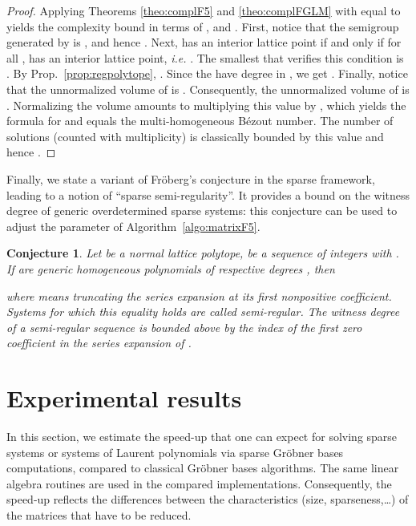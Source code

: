 \documentclass[12pt]{article}
\numberwithin{equation}{section}
\numberwithin{theorem}{section}
\newtheorem{conjecture}[theorem]{Conjecture}
\begin{document}
\begin{proof}
Applying Theorems \ref{theo:complF5} and
\ref{theo:complFGLM} with  equal to  yields the complexity bound in terms of ,
 and .
First, notice that the semigroup generated by  is , and hence .
Next,  
has an interior lattice point if and only if for all ,  has an interior
lattice point, \emph{i.e.} . The smallest  that verifies this condition is
. By Prop.~\ref{prop:regpolytope}, . Since the
 have degree  in , we get
.
Finally, notice that the unnormalized volume of  is . Consequently, the
unnormalized volume of  is . Normalizing the volume amounts to multiplying this
value by , which yields the formula for  and equals the multi-homogeneous B\'ezout number. The number of solutions (counted with multiplicity) is classically bounded by this value and hence .
\end{proof}



Finally, we state a variant of Fr\"oberg's conjecture
\cite{froberg1985inequality} in the sparse framework, leading to a
notion of ``sparse semi-regularity''. It provides a bound on the witness
degree of generic overdetermined sparse systems: this conjecture can be used to adjust the parameter  of Algorithm~\ref{algo:matrixF5}.

\begin{conjecture}\label{conj:froberg}
Let  be a normal lattice polytope,  be a sequence of integers with . If  are generic homogeneous polynomials of respective degrees , then 

where  means truncating the series expansion at its first nonpositive coefficient. 
Systems for which this equality holds are called \emph{semi-regular}. The witness degree of a semi-regular sequence is bounded above by the index of the first zero coefficient in the series expansion of .
\end{conjecture}



\section{Experimental results}\label{sec:expe}
In this section, we estimate the speed-up that one can expect for solving sparse
systems or systems of Laurent polynomials via sparse Gr\"obner bases computations, compared to classical Gr\"obner bases algorithms. 
The same linear algebra routines are used in the compared implementations. Consequently, the speed-up reflects the differences between the characteristics (size, sparseness,\ldots) of the matrices that have to be reduced.  
\end{document}
